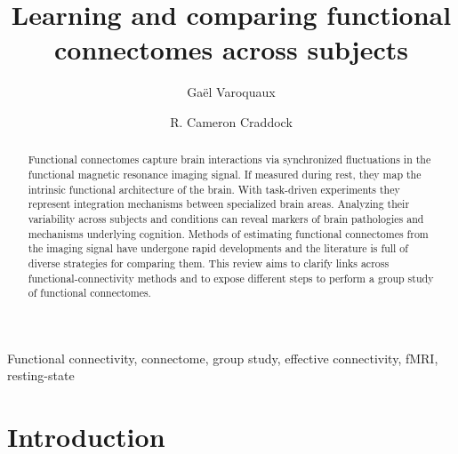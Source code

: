 \documentclass[5p]{elsarticle}
\begin{document}
\title{Learning and comparing functional connectomes across subjects}


\author[parietal,unicog,cea]{Ga\"el Varoquaux}
\author[cmi,nki]{R. Cameron Craddock}


\address[parietal]{Parietal project-team, INRIA Saclay-\^ile de France}
\address[unicog]{INSERM, U992}
\address[cea]{CEA/Neurospin b\^at 145, 91191 Gif-Sur-Yvette}
\address[cmi]{Child Mind Institute, New York, New York}
\address[nki]{Nathan Kline Institute for Psychiatric Research, Orangeburg, New York}

\begin{abstract}
	Functional connectomes capture brain interactions via synchronized
	fluctuations in the functional magnetic resonance imaging signal. If
	measured during rest, they map the intrinsic functional architecture of
	the brain. With task-driven experiments they represent integration
	mechanisms between specialized brain areas. Analyzing their variability
	across subjects and conditions can reveal
	markers of brain pathologies and mechanisms underlying cognition.
	Methods of estimating functional connectomes from the imaging signal
	have undergone rapid developments and the literature is full of diverse
	strategies for comparing them. This review aims to clarify links across
	functional-connectivity methods and to expose different steps 
	to perform a group study of functional connectomes.
\end{abstract}

\begin{keyword}
    Functional connectivity, connectome, group study, effective
    connectivity, fMRI, resting-state
\end{keyword}

\maketitle

\sloppy %

\section{Introduction}
\end{document}
